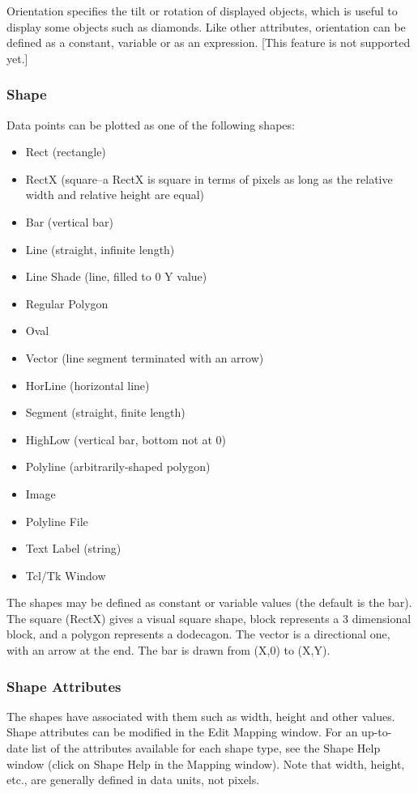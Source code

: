 Orientation specifies the tilt or rotation of displayed objects, which is useful
to display some objects such as diamonds. Like other attributes, orientation can
be defined as a constant, variable or as an expression. [This feature is not
supported yet.]

\subsubsection{Shape}

Data points can be plotted as one of the following shapes:

\begin{itemize}
	\item Rect (rectangle)
	\item RectX (square--a RectX is square in terms of pixels as long as
		the relative width and relative height are equal)
	\item Bar (vertical bar)
	\item Line (straight, infinite length)
	\item Line Shade (line, filled to 0 Y value)
	\item Regular Polygon
	\item Oval
	\item Vector (line segment terminated with an arrow)
	\item HorLine (horizontal line)
	\item Segment (straight, finite length)
	\item HighLow (vertical bar, bottom not at 0)
	\item Polyline (arbitrarily-shaped polygon)
	\item Image
	\item Polyline File
	\item Text Label (string)
	\item Tcl/Tk Window
\end{itemize}

The shapes may be defined as constant or variable values (the default is the
bar). The square (RectX) gives a visual square shape, block represents a 3
dimensional block, and a polygon represents a dodecagon. The vector is a
directional one, with an arrow at the end. The bar is drawn from (X,0) to (X,Y).

\subsubsection{Shape Attributes}

The shapes have associated with them such as width, height and other values.
Shape attributes can be modified in the Edit Mapping window. For an up-to-
date list of the attributes available for each shape type, see the Shape
Help window (click on Shape Help in the Mapping window).  Note that width,
height, etc., are generally defined in data units, not pixels.

